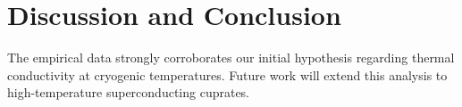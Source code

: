 \documentclass{article}
\begin{document}
\section{Discussion and Conclusion}
The empirical data strongly corroborates our initial hypothesis regarding thermal conductivity at cryogenic temperatures. Future work will extend this analysis to high-temperature superconducting cuprates.
\end{document}
